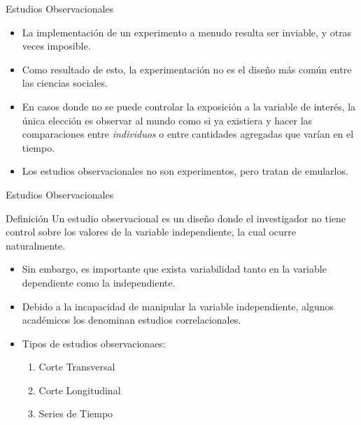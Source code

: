 \documentclass[xcolor=dvipsnames]{beamer}
\begin{document}
\begin{frame}{Estudios Observacionales}
\begin{itemize}
\justifying
\item La implementación de un experimento a menudo resulta ser inviable, y otras veces imposible.
\item Como resultado de esto, la experimentación no es el diseño más común entre las ciencias sociales.
\item En casos donde no se puede controlar la exposición a la variable de interés, la única elección es observar al mundo como si ya existiera y hacer las comparaciones entre \emph{individuos} o entre cantidades agregadas que varían en el tiempo.

\item Los estudios observacionales no son experimentos, pero tratan de emularlos.
\end{itemize}
\end{frame}

\begin{frame}{Estudios Observacionales}
\begin{block}{Definición}
Un estudio observacional es un diseño donde el investigador no tiene control sobre los valores de la variable independiente, la cual ocurre naturalmente.
\end{block}
\begin{itemize}
\justifying
\item Sin embargo, es importante que exista variabilidad tanto en la variable dependiente como la independiente.
\item Debido a la incapacidad de manipular la variable independiente, algunos académicos los denominan estudios correlacionales.
\item Tipos de estudios observacionaes:
\begin{enumerate}
\item Corte Transversal
\item Corte Longitudinal
\item Series de Tiempo
\end{enumerate}
\end{itemize}
\end{frame}

\end{document}
